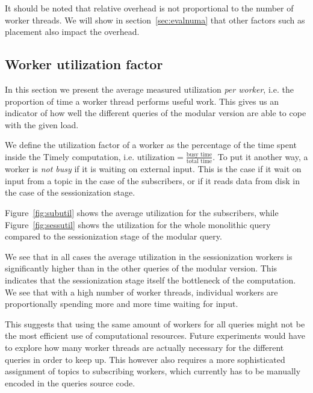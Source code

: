 It should be noted that relative overhead is not proportional to the number
of worker threads. We will show in section~\ref{sec:evalnuma} that other
factors such as placement also impact the overhead.

\clearpage

\subsection{Worker utilization factor}

In this section we present the average measured utilization \emph{per worker},
i.e. the proportion of time a worker thread performs useful work.
This gives us an indicator of how well the different queries of the modular
version are able to cope with the given load.

We define the utilization factor of a worker as the percentage of
the time spent inside the Timely computation, i.e.
$\text{utilization} = \frac{\text{busy time}}{\text{total time}}$.
To put it another way, a worker is \emph{not busy} if it is waiting on external input.
This is the case if it wait on input from a topic in the case of the subscribers, 
or if it reads data from disk in the case of the sessionization stage.

Figure~\ref{fig:subutil} shows the average utilization for the subscribers, while
Figure~\ref{fig:sessutil} shows the utilization for the whole monolithic query
compared to the sessionization stage of the modular query. 

We see that in all cases the average utilization in the sessionization workers
is significantly higher than in the other queries of the modular version. This indicates
that the sessionization stage itself the bottleneck of the computation. 
We see that with a high number of worker threads, individual workers are proportionally
spending more and more time waiting for input.

This suggests that using the same amount of workers for all queries might
not be the most efficient use of computational resources. Future experiments would have to
explore how many worker threads are actually necessary for the different queries
in order to keep up. This however also requires a more sophisticated assignment of
topics to subscribing workers, which currently has to be manually encoded in
the queries source code.

